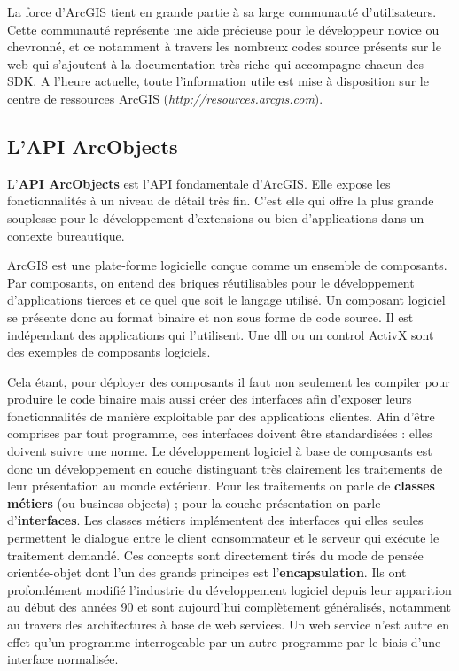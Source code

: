 \documentclass[11pt]{article}
\begin{document}
La force d'ArcGIS tient en grande partie à sa large communauté d'utilisateurs. Cette communauté représente une aide précieuse pour le développeur novice ou chevronné, et ce notamment à travers les nombreux codes source présents sur le web qui s'ajoutent à la documentation très riche qui accompagne chacun des SDK. A l'heure actuelle, toute l'information utile est mise à disposition sur le centre de ressources ArcGIS (\textit{http://resources.arcgis.com}).


\subsection{L'API ArcObjects}
L'\textbf{API ArcObjects} est l'API fondamentale d'ArcGIS. Elle expose les fonctionnalités à un niveau de détail très fin. C'est elle qui offre la plus grande souplesse pour le développement d'extensions ou bien d'applications dans un contexte bureautique.

ArcGIS est une plate-forme logicielle conçue comme un ensemble de composants. Par composants, on entend des briques réutilisables pour le développement d'applications tierces et ce quel que soit le langage utilisé. Un composant logiciel se présente donc au format binaire et non sous forme de code source. Il est indépendant des applications qui l'utilisent. Une dll ou un control ActivX sont des exemples de composants logiciels.

Cela  étant, pour déployer des composants il faut non seulement les compiler pour produire le code binaire mais aussi créer des interfaces afin d'exposer leurs fonctionnalités de manière exploitable par des applications clientes. Afin d'être comprises par tout programme, ces interfaces doivent être standardisées : elles doivent suivre une norme. Le développement logiciel à base de composants est donc un développement en couche distinguant très clairement les traitements de leur présentation au monde extérieur. Pour les traitements on parle de \textbf{classes métiers} (ou business objects) ; pour la couche présentation on parle d'\textbf{interfaces}. Les classes métiers implémentent des interfaces qui elles seules permettent le dialogue entre le client consommateur et le serveur qui exécute le traitement demandé. Ces concepts sont directement tirés du mode de pensée orientée-objet dont l'un des grands principes est l'\textbf{encapsulation}. Ils ont profondément modifié l'industrie du développement logiciel depuis leur apparition au début des années 90 et sont aujourd'hui complètement généralisés, notamment au travers des architectures à base de web services. Un web service n'est autre en effet qu'un programme interrogeable par un autre programme par le biais d'une interface normalisée.
\end{document}
